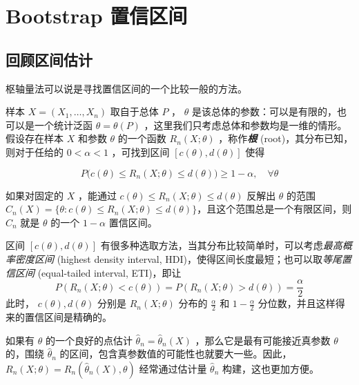 

\section{Bootstrap 置信区间}

\subsection{回顾区间估计}

枢轴量法可以说是寻找置信区间的一个比较一般的方法。

样本 $X=(X_1,\dots,X_n)$ 取自于总体 $P$ ， $\theta$ 是该总体的参数：可以是有限的，也可以是一个统计泛函 $\theta=\theta(P)$ ，这里我们只考虑总体和参数均是一维的情形。假设存在样本 $X$ 和参数 $\theta$ 的一个函数 $R_n(X;\theta)$ ，称作\textbf{\emph{根}} (root)，其分布已知，则对于任给的 $0<\alpha<1$ ，可找到区间 $[c(\theta),d(\theta)]$ 使得

\begin{equation}
\label{eq:ch11b:tag-5}
P\big(c(\theta)\le R_n(X;\theta)\le d(\theta)\big)\ge 1-\alpha,\quad \forall\theta
\end{equation}

如果对固定的 $X$ ，能通过 $c(\theta)\le R_n(X;\theta)\le d(\theta)$ 反解出 $\theta$ 的范围 $C_n(X)=\{\theta:c(\theta)\le R_n(X;\theta)\le d(\theta)\}$，且这个范围总是一个有限区间，则 $C_n$ 就是 $\theta$ 的一个 $1-\alpha$ 置信区间。

区间 $[c(\theta),d(\theta)]$ 有很多种选取方法，当其分布比较简单时，可以考虑\emph{最高概率密度区间 }(highest density interval, HDI)，使得区间长度最短；也可以取\emph{等尾置信区间} (equal-tailed interval, ETI)，即让 \[ P(R_n(X;\theta)<c(\theta))=P(R_n(X;\theta)>d(\theta))=\frac\alpha2 \]此时， $c(\theta),d(\theta)$ 分别是 $R_n(X;\theta)$ 分布的 $\tfrac\alpha2$ 和 $1-\tfrac\alpha2$ 分位数，并且这样得来的置信区间是精确的。

如果有 $\theta$ 的一个良好的点估计 $\widehat\theta_n=\widehat\theta_n(X)$ ，那么它是最有可能接近真参数 $\theta$ 的，围绕 $\widehat\theta_n$ 的区间，包含真参数值的可能性也就要大一些。因此， $R_n(X;\theta)=R_n(\widehat\theta_n(X),\theta)$ 经常通过估计量 $\widehat\theta_n$ 构建，这也更加方便。

